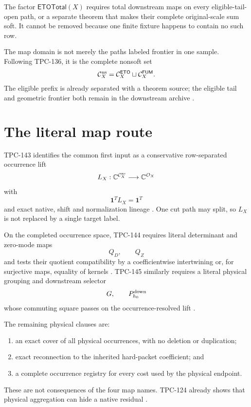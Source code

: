 \documentclass[11pt]{article}
\theoremstyle{definition}
\theoremstyle{remark}
\newcommand{\one}{\mathbf 1}
\begin{document}
The factor \(\mathsf{ETOTotal}(X)\) requires total downstream maps on
every eligible-tail-open path, or a separate theorem that makes their
complete original-scale sum soft.  It cannot be removed because one
finite fixture happens to contain no such row.

The map domain is not merely the paths labeled frontier in one sample.
Following TPC-136, it is the complete nonsoft set
\begin{equation}
 \mathcal C_X^{\rm ns}
 =
 \mathcal C_X^{\mathsf{ETO}}
 \sqcup
 \mathcal C_X^{\mathsf{FUM}}.
 \label{eq:domain}
\end{equation}
The eligible prefix is already separated with a theorem source; the
eligible tail and geometric frontier both remain in the downstream
archive \citep{WangTPC136}.

\section{The literal map route}

TPC-143 identifies the common first input as a conservative
row-separated occurrence lift
\[
 L_X:\mathbb C^{\mathcal C_X^{\rm ns}}
 \longrightarrow\mathbb C^{\mathcal O_X}
\]
with
\begin{equation}
 \one^TL_X=\one^T
 \label{eq:Lconservation}
\end{equation}
and exact native, shift and normalization lineage
\citep{WangTPC143}.  One cut path may split, so \(L_X\) is not
replaced by a single target label.

On the completed occurrence space, TPC-144 requires literal
determinant and zero-mode maps
\[
 Q_D,\qquad Q_Z
\]
and tests their quotient compatibility by a coefficientwise
intertwining or, for surjective maps, equality of kernels
\citep{WangTPC144}.  TPC-145 similarly requires a literal physical
grouping and downstream selector
\[
 G,\qquad P_{h_0}^{\rm down}
\]
whose commuting square passes on the occurrence-resolved lift
\citep{WangTPC145}.

The remaining physical clauses are:
\begin{enumerate}[label=(\roman*),leftmargin=2.2em]
\item an exact cover of all physical occurrences, with no deletion or
duplication;
\item exact reconnection to the inherited hard-packet coefficient;
and
\item a complete occurrence registry for every cost used by the
physical endpoint.
\end{enumerate}
These are not consequences of the four map names.  TPC-124 already
shows that physical aggregation can hide a native residual
\citep{WangTPC124}.
\end{document}
